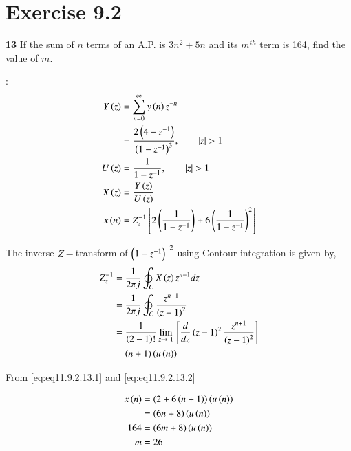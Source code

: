 \documentclass[journal,12pt,twocolumn]{IEEEtran}
\begin{document}


\vspace{3cm}

\title{}
\author{EE23BTECH11054 -  Sai Krishna Shanigarapu$^{*}$
}
\maketitle
\newpage
\bigskip


\section*{Exercise 9.2}

\noindent \textbf{13} \hspace{2pt}If the sum of $n$ terms of an A.P. is $3n^2+5n$ and its $m^{th}$ term is 164, find the value of $m$.
\bigskip

\solution:
\noindent
\begin{align}
Y\left(z\right) &=  \sum_{n=0}^{\infty} y\left(n\right)z^{-n} \\
&= \frac{2\left(4-z^{-1}\right)}{\left(1-z^{-1}\right)^3}, \qquad |z| > 1\\
U\left(z\right) &= \frac{1}{1-z^{-1}}, \qquad |z| > 1\\
X\left(z\right) &=  \frac{Y\left(z\right)}{U\left(z\right)}\\
x\left(n\right) &= Z_{z}^{-1}{}\left[2\left(\frac{1}{1-z^{-1}}\right) + 6\left(\frac{1}{1-z^{-1}}\right) ^2\right] \label{eq:eq11.9.2.13.1}
\end{align}


The inverse $Z-$transform of $\left(1-z^{-1}\right)^{-2}$ using Contour integration is given by,
\begin{align}
    Z_z^{-1} &= \frac{1}{2\pi j}\oint_C X\brak{z}z^{n-1}dz\\
    &= \frac{1}{2\pi j}\oint_C \frac{z^{n+1}}{\brak{z-1}^2}\\
    &= \frac{1}{\brak{2-1}!} \lim_{z \to\ 1}{\sbrak{\frac{d}{dz}\brak{z-1}^2 \frac{z^{n+1}}{\brak{z-1}^2} }}\\
    &= \brak{n+1}\brak{u\brak{n}} \label{eq:eq11.9.2.13.2}
\end{align}

From \eqref{eq:eq11.9.2.13.1} and \eqref{eq:eq11.9.2.13.2}

\begin{align}
    x\left(n\right) &= \left(2 + 6\left(n+1\right)\right)\left(u\left(n\right)\right)\\
    &= \left(6n+8\right)\left(u\left(n\right)\right)\\
    164 &= \left(6m+8\right)\left(u\left(n\right)\right)\\
    m &= 26
\end{align}
\end{document}
